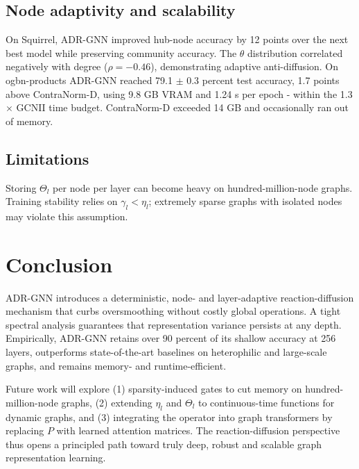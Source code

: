 \documentclass{article}
\begin{document}
\subsection{Node adaptivity and scalability}
On Squirrel, ADR-GNN improved hub-node accuracy by 12 points over the next best model while preserving community accuracy. The \(\theta\) distribution correlated negatively with degree (\(\rho = -0.46\)), demonstrating adaptive anti-diffusion. On ogbn-products ADR-GNN reached 79.1 \(\pm\) 0.3 percent test accuracy, 1.7 points above ContraNorm-D, using 9.8 GB VRAM and 1.24 s per epoch - within the 1.3\(\times\) GCNII time budget. ContraNorm-D exceeded 14 GB and occasionally ran out of memory.

\subsection{Limitations}
Storing \(\Theta_l\) per node per layer can become heavy on hundred-million-node graphs. Training stability relies on \(\gamma_l < \eta_l\); extremely sparse graphs with isolated nodes may violate this assumption.

\section{Conclusion}
ADR-GNN introduces a deterministic, node- and layer-adaptive reaction-diffusion mechanism that curbs oversmoothing without costly global operations. A tight spectral analysis guarantees that representation variance persists at any depth. Empirically, ADR-GNN retains over 90 percent of its shallow accuracy at 256 layers, outperforms state-of-the-art baselines on heterophilic and large-scale graphs, and remains memory- and runtime-efficient.

Future work will explore (1) sparsity-induced gates to cut memory on hundred-million-node graphs, (2) extending \(\eta_l\) and \(\Theta_l\) to continuous-time functions for dynamic graphs, and (3) integrating the operator into graph transformers by replacing \(P\) with learned attention matrices. The reaction-diffusion perspective thus opens a principled path toward truly deep, robust and scalable graph representation learning.




\end{document}
